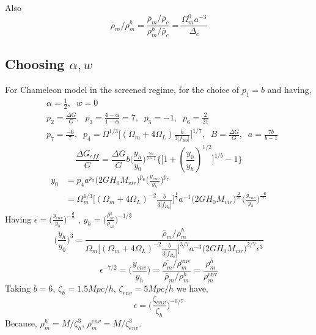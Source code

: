 \documentclass[a4paper,10pt]{article}
\def\be{\begin{equation}}
\def\ee{\end{equation}}
\begin{document}
 Also 
 \be
 \bar{\rho}_m/\rho_m^h  =  \frac{\bar{\rho}_m/\bar{\rho}_c }{\rho_m^h/\bar{\rho}_c }= \frac{\Omega_m^0 a^{-3}}{\Delta_c}
\ee

\subsection{Choosing $\alpha, w$}
For Chameleon model in the screened regime, for the choice of $p_1=b$ and having,
\begin{align}
& \alpha=\frac12, \; \; w=0 \nonumber \\ & 
 p_2 = \frac{\Delta G}{G}, \; \;  p_3 = \frac{4-\alpha}{1-\alpha} = 7,\; \; p_5=-1, \; \; p_6= \frac2 {21} \\ & \nonumber
 p_7=\frac{-6}{7},  \; \; p_4=\Omega^{1/3} \Big[ (\Omega_m + 4\Omega_L)  \frac{b}{3 |f_{R0}|}\Big]^{1/7},   \; \;  B = \frac{\Delta G}{G}, \; \; a = \frac{7b}{b-1}
\end{align} 
\be
\frac{\Delta G_{eff}}{G} = \frac{\Delta G}{G} b \Big (\frac{y_h}{y_0} \Big)^{\frac{7b}{b-1}} \Big\{ \big[ 1+ (\frac{y_0}{y_h})^{1/2} \big]^{1/b}  -1 \Big\}
\ee
\begin{align}
y_0  &= p_4 a^{p_5} \Big( 2 G H_0 M_{vir} \Big)^{p_6} \Big(\frac{y_{env}}{y_h} \Big)^{p_7} \nonumber \\ &
= \Omega_m^{1/3} \Big[ (\Omega_m + 4 \Omega_L)^{-2} \frac{b}{3|f_{R_0}|} \Big]^{\frac{1}{7}} a^{-1} \big( 2 G H_0 M_{vir} \big)^{\frac{2}{21}} \Big( \frac{y_{env}}{y_h} \Big)^{\frac{-6}{7}}
\end{align}
Having $\epsilon = \Big( \frac{y_{env}}{y_h} \Big)^{-\frac{6}{7}}$ , $y_h=\big( \frac{\rho_m^h}{\bar{\rho}_m} \big)^{-1/3}$
\be
\Big(\frac{y_h}{y_0} \Big)^{3} = \frac{\bar{\rho}_m/\rho_m^h}{\Omega_m \Big[ (\Omega_m + 4 \Omega_L) ^{-2} \frac{b}{3 |f_{R_0}|} \Big]^{3/7} a^{-3} \big( 2 G H_0 M_{vir} \big)^{2/7}  \epsilon ^3}
\ee
\be
\epsilon^{-7/2} = \Big( \frac{y_{env}}{y_h} \Big) = \frac{\bar{\rho_m}/ \rho_m^{\text{env}}}{\bar{\rho}_m/\rho_m^h} = \frac{\rho_m^h}{\rho_m^{\text{env}}}
\ee
Taking $b=6$, $\zeta_h = 1.5 Mpc/h$, $\zeta_{env} = 5 Mpc/h$ we have,
\be
\epsilon = \Big( \frac{\zeta_{env}}{\zeta_h} \Big)^{-6/7}
\ee
Because, $\rho_m^h = M/\zeta_h^3$, $\rho_m^{env} = M/\zeta_{env}^3$.
\end{document}
